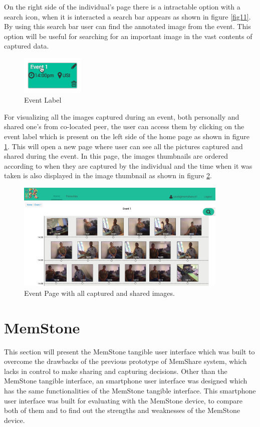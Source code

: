 \documentclass[mscthesis]{usiinfthesis}
\begin{document}
On the right side of the individual's page there is a intractable option with a search icon, when it is interacted a search bar appears as shown in figure \ref{fig11}. By using this search bar user can find the annotated image from the event. This option will be useful for searching for an important image in the vast contents of captured data. 

\begin{figure}[!ht]
  \centering
  \includegraphics[width=0.27\textwidth]{EventLabel}
  \caption{Event Label}
  \label{fig13}
\end{figure}

For visualizing all the images captured during an event, both personally and shared one's from co-located peer, the user can access them by clicking on the event label which is present on the left side of the home page as shown in figure \ref{fig13}. This will open a new page where user can see all the pictures captured and shared during the event. In this page, the images thumbnails are ordered according to when they are captured by the individual and the time when it was taken is also displayed in the image thumbnail as shown in figure \ref{fig14}.

\begin{figure}[!ht]
  \centering
  \includegraphics[width=0.9\textwidth]{EventPage}
  \caption{Event Page with all captured and shared images.}
  \label{fig14}
\end{figure}

\section{MemStone}
\label{sec:mem}
This section will present the MemStone tangible user interface which was built to overcome the drawbacks of the previous prototype of MemShare system, which lacks in control to make sharing and capturing decisions. Other than the MemStone tangible interface, an smartphone user interface was designed which has the same functionalities of the MemStone tangible interface. This smartphone user interface was built for evaluating with the MemStone device, to compare both of them and to find out the strengths and weaknesses of the MemStone device. 
\end{document}
